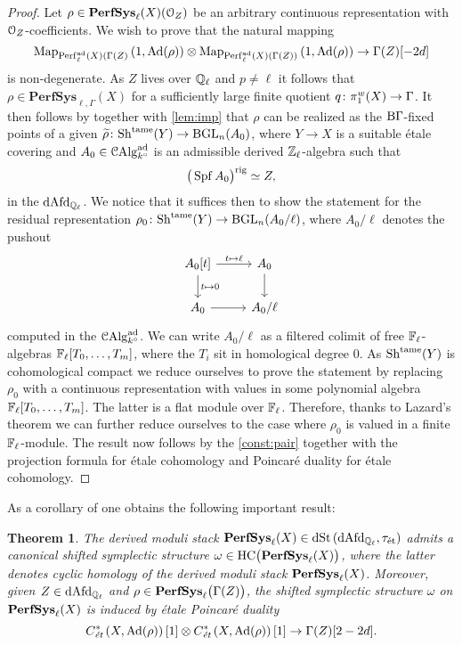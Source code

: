 \documentclass[10pt,a4paper]{amsart}
\numberwithin{equation}{subsection}
\theoremstyle{plain}
\newtheorem{theorem}{Theorem}[section]
\theoremstyle{definition}
\theoremstyle{remark}
\numberwithin{equation}{section}
\begin{document}
\begin{proof}
Let $\rho \in \mathbf{PerfSys}_{\ell}(X) ( \mathcal{O}_Z)$ be an arbitrary continuous representation with $\mathcal{O}_Z$-coefficients. We wish to prove that the natural mapping
	\[
		\mathrm{Map}_{\mathrm{Perf}^{\mathrm{ad}}_\ell(X)(\Gamma(Z)} \left( 1, \mathrm{Ad} (\rho) \right) \otimes \mathrm{Map}_{\mathrm{Perf}^{\mathrm{ad}}_\ell(X)(\Gamma(Z))} \left( 1, \mathrm{Ad}(\rho) \right) \to \Gamma(Z) [-2d]
	\]
is non-degenerate. As $Z $ lives over $\mathbb Q_\ell$ and $p \neq \ell$ it follows that $\rho \in \mathbf{PerfSys}_{\ell, \Gamma}(X)$
for a sufficiently large finite quotient $q \colon \pi_1^w(X) \to \Gamma$. It then follows by \cite[Proposition 4.3.19]{me1} together with \cref{lem:imp} that
$\rho$ can be realized as the $\mathrm{B} \Gamma$-fixed points of a given $\widetilde{\rho} \colon \mathrm{Sh}^{\mathrm{tame}}(Y) \to \mathrm{B} \mathrm{GL}_n(A_0)$, where $Y \to X$ is a suitable \'etale covering and  $A_0 \in \mathcal C \mathrm{Alg}^{\mathrm{ad}}_{k^\circ}$ is an admissible derived $\mathbb Z_\ell$-algebra such that
	\[
		\big( \operatorname{Spf} A_0 \big)^{\mathrm{rig}} \simeq Z, 
	\]
in the \infcat $\mathrm{dAfd}_{\mathbb{Q}_\ell}$. We notice that it suffices then to show the statement for the residual representation $\rho_0 \colon \mathrm{Sh}^{\mathrm{tame}} (Y) \to \mathrm{B} \mathrm{GL}_n(A_0 / \ell)$, where $A_0 / \ell$ denotes the pushout
	\[
	\begin{tikzcd}
		A_0[t] \ar{r}{t \mapsto \ell}  \ar{d}{t \mapsto 0} & A_0 \ar{d} \\
		A_0 \ar{r} & A_0 / \ell
	\end{tikzcd}
	\]
computed in the \infcat $\mathcal C \mathrm{Alg}^{\mathrm{ad}}_{k^\circ}$. We can write $A_0 / \ell$ as a filtered colimit of free $\mathbb F_\ell$-algebras $\mathbb F_\ell[T_0, \dots, T_m]$, where the $T_i $ sit in homological degree $0$. As $\mathrm{Sh}^{\mathrm{tame}}(Y)$ is cohomological compact we reduce
ourselves to prove the statement by replacing $\rho_0$ with a continuous representation with values in some polynomial algebra $\mathbb F_\ell[T_0, \dots, T_m]$. The latter is a flat module over $\mathbb F_\ell$. Therefore, thanks to Lazard's theorem
\cite[Theorem 8.2.2.15]{lurieHA} we can further reduce ourselves to the case where $\rho_0$ is valued in a finite $\mathbb F_\ell$-module. The result now follows by the \cref{const:pair} together with the projection formula for \'etale cohomology
and Poincar\'e duality for \'etale cohomology.
\end{proof}

As a corollary of \cite[Theorem 3.7]{toen_ss} one obtains the following important result:

\begin{theorem}
The derived moduli stack $\mathbf{PerfSys}_{\ell}(X) \in \mathrm{dSt} \left( \mathrm{dAfd}_{\mathbb{Q}_\ell}, \tau_{\text{\'et}} \right)$ admits a canonical shifted symplectic structure $\omega \in \mathrm H \mathrm C \big(\mathbf{PerfSys}_{\ell}(X) \big)$, where the latter denotes cyclic homology of the derived moduli stack
$\mathbf{PerfSys}_{\ell}(X)$. Moreover, given $Z \in \mathrm{dAfd}_{\mathbb{Q}_\ell}$ and $\rho \in \mathbf{PerfSys}_{\ell} \big( \Gamma(Z) \big)$, the shifted symplectic structure $\omega$ on $\mathbf{PerfSys}_{\ell}(X)$
is induced by \emph{\'etale Poincar\'e duality}
	\[
		C^*_{\emph{\text{\'et}}}\left(X, \mathrm{Ad}(\rho) \right) [1] \otimes C^*_{\emph{\text{\'et}}} \left( X, \mathrm{Ad}(\rho) \right) [1] \to \Gamma(Z)[2-2d].
	\]
\end{theorem}
\end{document}
